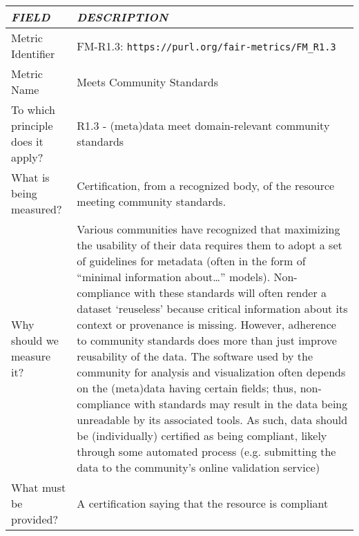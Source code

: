 \documentclass[english]{article}
\begin{document}
\begin{longtable}{|p{5cm}|p{9cm}|}


\hline
\emph{FIELD} & \emph{DESCRIPTION} \\
\hline
Metric Identifier &   FM-R1.3: \verb"https://purl.org/fair-metrics/FM_R1.3"
\\


\hline
Metric Name &   



Meets Community Standards


 \\



\hline
To which principle does it apply? &   


R1.3 - (meta)data meet domain-relevant community standards

\\



\hline
What is being measured? & 


Certification, from a recognized body, of the resource meeting community standards.

\\



\hline
Why should we measure it? & 

Various communities have recognized that maximizing the usability of their data requires them to adopt a set of guidelines for metadata (often in the form of “minimal information about…” models).  Non-compliance with these standards will often render a dataset ‘reuseless’ because critical information about its context or provenance is missing.  However, adherence to community standards does more than just improve reusability of the data. The software used by the community for analysis and visualization often depends on the (meta)data having certain fields; thus, non-compliance with standards may result in the data being unreadable by its associated tools.  As such, data should be (individually) certified as being compliant, likely through some automated process (e.g. submitting the data to the community’s online validation service)


  
\\



\hline
What must be provided? &  

A certification saying that the resource is compliant



\end{longtable}
\end{document}
